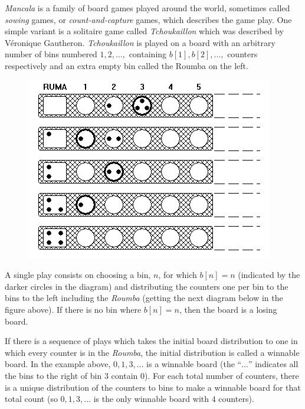 
\emph{Mancala} is a family of board games played around the world, sometimes
called \emph{sowing} games, or \emph{count-and-capture} games, which describes the
game play.  One simple variant is a solitaire game called \emph{Tchoukaillon}
which was described by V\'eronique Gautheron.  \emph{Tchoukaillon} is played on
a board with an arbitrary number of bins numbered $1, 2, \ldots,$  containing
$b[1], b[2], ... ,$ counters respectively and an extra empty bin called
the Roumba on the left.

\begin{figure}[!h]
    \begin{center}
        \includegraphics[]{e1.png} \\
    \end{center}
\end{figure}

A single play consists on choosing a bin, $n$, for which $b[n] = n$ (indicated
by the darker circles in the diagram) and distributing the counters one
per bin to the bins to the left including the \emph{Roumba} (getting the next
diagram below in the figure above).  If there is no bin where $b[n] = n$,
then the board is a losing board.

If there is a sequence of plays which takes the initial board distribution
to one in which every counter is in the \emph{Roumba}, the initial distribution
is called a winnable board.  In the example above, $0,1,3,\ldots$ is a
winnable board (the ``$\ldots$'' indicates all the bins to the right of
bin 3 contain 0).  For each total number of counters, there is a unique
distribution of the counters to bins to make a winnable board for that
total count (so $0,1,3,\ldots$ is the only winnable board with $4$ counters).

